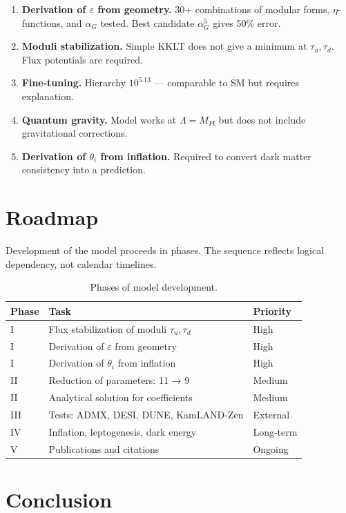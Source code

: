 \documentclass[12pt,a4paper]{article}
\numberwithin{equation}{section}
\begin{document}
\begin{enumerate}[leftmargin=1.5em]
\item \textbf{Derivation of $\varepsilon$ from geometry.} 30+
combinations of modular forms, $\eta$-functions, and $\alpha_G$
tested. Best candidate $\alpha_G^5$ gives 50\% error.
\item \textbf{Moduli stabilization.} Simple KKLT does not give
a minimum at $\tau_u, \tau_d$. Flux potentials are required.
\item \textbf{Fine-tuning.} Hierarchy $10^{5.13}$ — comparable
to SM but requires explanation.
\item \textbf{Quantum gravity.} Model works at $\Lambda = M_{Pl}$
but does not include gravitational corrections.
\item \textbf{Derivation of $\theta_i$ from inflation.}
Required to convert dark matter consistency into a prediction.
\end{enumerate}

\section{Roadmap}
\label{sec:roadmap}

Development of the model proceeds in phases. The sequence 
reflects logical dependency, not calendar timelines.

\begin{table}[H]
\centering
\caption{Phases of model development.}
\begin{tabular}{p{1.5cm}p{8cm}p{3cm}}
\toprule
Phase & Task & Priority \\
\midrule
I & Flux stabilization of moduli $\tau_u, \tau_d$ & High \\
I & Derivation of $\varepsilon$ from geometry & High \\
I & Derivation of $\theta_i$ from inflation & High \\
II & Reduction of parameters: 11 → 9 & Medium \\
II & Analytical solution for coefficients & Medium \\
III & Tests: ADMX, DESI, DUNE, KamLAND-Zen & External \\
IV & Inflation, leptogenesis, dark energy & Long-term \\
V & Publications and citations & Ongoing \\
\bottomrule
\end{tabular}
\end{table}
\section{Conclusion}
\end{document}
